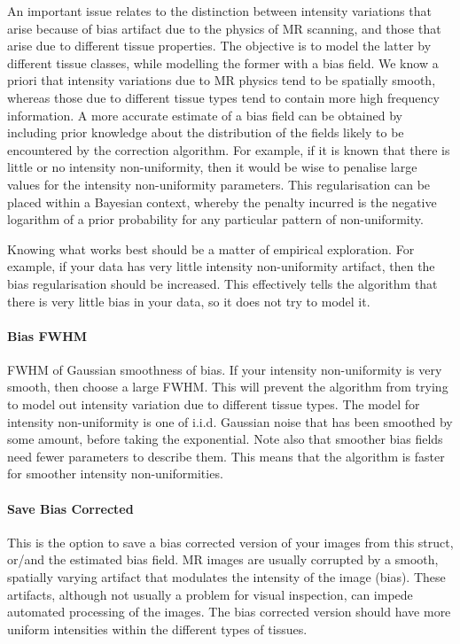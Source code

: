 An important issue relates to the distinction between intensity variations that arise because of bias artifact due to the physics of MR scanning, and those that arise due to different tissue properties.  The objective is to model the latter by different tissue classes, while modelling the former with a bias field. We know a priori that intensity variations due to MR physics tend to be spatially smooth, whereas those due to different tissue types tend to contain more high frequency information. A more accurate estimate of a bias field can be obtained by including prior knowledge about the distribution of the fields likely to be encountered by the correction algorithm. For example, if it is known that there is little or no intensity non-uniformity, then it would be wise to penalise large values for the intensity non-uniformity parameters. This regularisation can be placed within a Bayesian context, whereby the penalty incurred is the negative logarithm of a prior probability for any particular pattern of non-uniformity.

Knowing what works best should be a matter of empirical exploration.  For example, if your data has very little intensity non-uniformity artifact, then the bias regularisation should be increased.  This effectively tells the algorithm that there is very little bias in your data, so it does not try to model it.


\paragraph{Bias FWHM}
FWHM of Gaussian smoothness of bias. If your intensity non-uniformity is very smooth, then choose a large FWHM. This will prevent the algorithm from trying to model out intensity variation due to different tissue types. The model for intensity non-uniformity is one of i.i.d. Gaussian noise that has been smoothed by some amount, before taking the exponential. Note also that smoother bias fields need fewer parameters to describe them. This means that the algorithm is faster for smoother intensity non-uniformities.


\paragraph{Save Bias Corrected}
This is the option to save a bias corrected version of your images from this struct, or/and the estimated bias field. MR images are usually corrupted by a smooth, spatially varying artifact that modulates the intensity of the image (bias). These artifacts, although not usually a problem for visual inspection, can impede automated processing of the images.  The bias corrected version should have more uniform intensities within the different types of tissues.


